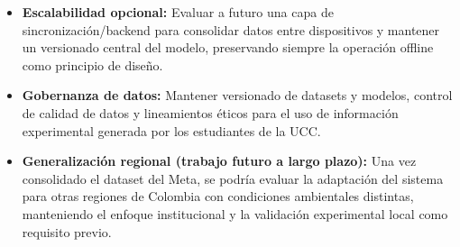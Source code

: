 \begin{itemize}
  \item \textbf{Escalabilidad opcional:} Evaluar a futuro una capa de sincronización/backend para consolidar datos entre dispositivos y mantener un versionado central del modelo, preservando siempre la operación offline como principio de diseño.

  \item \textbf{Gobernanza de datos:} Mantener versionado de datasets y modelos, control de calidad de datos y lineamientos éticos para el uso de información experimental generada por los estudiantes de la UCC.

  \item \textbf{Generalización regional (trabajo futuro a largo plazo):} Una vez consolidado el dataset del Meta, se podría evaluar la adaptación del sistema para otras regiones de Colombia con condiciones ambientales distintas, manteniendo el enfoque institucional y la validación experimental local como requisito previo.
\end{itemize}
